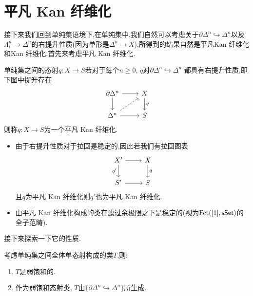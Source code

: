 \section{平凡 Kan 纤维化}
接下来我们回到单纯集语境下,在单纯集中,我们自然可以考虑关于$\partial \Delta^n \hookrightarrow \Delta^n$以及$\Lambda_i^n \to \Delta^n$的右提升性质(因为单形是$\Delta^n \to X$),所得到的结果自然是平凡Kan 纤维化和Kan 纤维化,首先来考虑平凡 Kan 纤维化.
\begin{definition}
    单纯集之间的态射$q: X \to S$若对于每个$n \geq 0$, $q$对$\partial \Delta^n \hookrightarrow \Delta^n$ 都具有右提升性质,即下图中提升存在
    \[\begin{tikzcd}
	{\partial \Delta^n} & X \\
	{\Delta^n} & S
	\arrow[from=1-1, to=1-2]
	\arrow[from=1-1, to=2-1]
	\arrow["q", from=1-2, to=2-2]
	\arrow[dashed, from=2-1, to=1-2]
	\arrow[from=2-1, to=2-2]
    \end{tikzcd}\]
    则称$q: X \to S$为一个平凡 Kan 纤维化.
\end{definition}
\begin{remark}\label{注记:平凡 Kan 纤维化}
    \begin{itemize}
    \item 由于右提升性质对于拉回是稳定的,因此若我们有拉回图表
    \[\begin{tikzcd}
	{X'} & X \\
	{S'} & S
	\arrow[from=1-1, to=1-2]
	\arrow["{q'}"', from=1-1, to=2-1]
	\arrow["q", from=1-2, to=2-2]
	\arrow[from=2-1, to=2-2]
    \end{tikzcd}\]
    且$q$为平凡 Kan 纤维化则$q'$也为平凡 Kan 纤维化.
    \item 由平凡 Kan 纤维化构成的类在滤过余极限之下是稳定的(视为$\operatorname{Fct}([1],\mathsf{sSet})$的全子范畴).
    \end{itemize}
\end{remark}
接下来探索一下它的性质.
\begin{proposition}\label{命题:单态射类弱饱和}
    考虑单纯集之间全体单态射构成的类$T$,则:
    \begin{enumerate}
        \item $T$是弱饱和的.
        \item 作为弱饱和态射类, $T$由$\{\partial \Delta^n \hookrightarrow \Delta^n\}$所生成.
    \end{enumerate}
\end{proposition}
